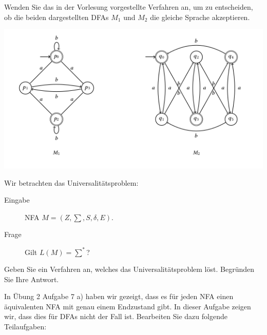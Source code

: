 \documentclass[10pt, a4paper]{exam}
\begin{document}
\begin{questions}
    \question Wenden Sie das in der Vorlesung vorgestellte Verfahren an, um zu entscheiden, ob die beiden dargestellten DFAs $M_1$ und $M_2$ die gleiche Sprache akzeptieren.

    \includegraphics{Assets/ASK_uebung/u04_01.png}

    \begin{solution}
    \end{solution}

    \question Wir betrachten das Universalitätsproblem:
    \begin{description}
        \item[Eingabe] NFA $M = (Z , \sum, S, \delta, E)$.
        \item[Frage] Gilt $L(M) = \sum^*$?
    \end{description}
    Geben Sie ein Verfahren an, welches das Universalitätsproblem löst. Begründen Sie Ihre Antwort.
    \begin{solution}
    \end{solution}


    \question In Übung 2 Aufgabe 7 a) haben wir gezeigt, dass es für jeden NFA einen äquivalenten NFA mit genau einem Endzustand gibt. In dieser Aufgabe zeigen wir, dass dies für DFAs nicht der Fall ist. Bearbeiten Sie dazu folgende Teilaufgaben:
\end{questions}
\end{document}
